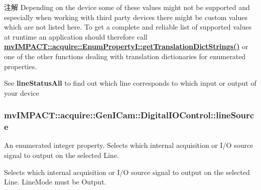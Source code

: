 \begin{DoxyNote}{注解}
Depending on the device some of these values might not be supported and especially when working with third party devices there might be custom values which are not listed here. To get a complete and reliable list of supported values at runtime an application should therefore call {\bfseries \hyperlink{classmv_i_m_p_a_c_t_1_1acquire_1_1_enum_property_i_a0ba6ccbf5ee69784d5d0b537924d26b6}{mv\+I\+M\+P\+A\+C\+T\+::acquire\+::\+Enum\+Property\+I\+::get\+Translation\+Dict\+Strings()}} or one of the other functions dealing with translation dictionaries for enumerated properties.
\end{DoxyNote}
See {\bfseries line\+Status\+All} to find out which line corresponds to which input or output of your device \hypertarget{classmv_i_m_p_a_c_t_1_1acquire_1_1_gen_i_cam_1_1_digital_i_o_control_abf9678823e6ff4071d5fdf3fa0c0a6a6}{
\subsubsection[{line\+Source}]{ mv\+I\+M\+P\+A\+C\+T\+::acquire\+::\+Gen\+I\+Cam\+::\+Digital\+I\+O\+Control\+::line\+Source}}\label{classmv_i_m_p_a_c_t_1_1acquire_1_1_gen_i_cam_1_1_digital_i_o_control_abf9678823e6ff4071d5fdf3fa0c0a6a6}


An enumerated integer property. Selects which internal acquisition or I/\+O source signal to output on the selected Line. 

Selects which internal acquisition or I/\+O source signal to output on the selected Line. Line\+Mode must be Output.

